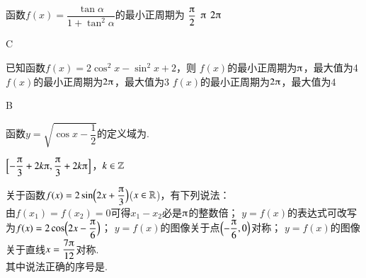     \begin{exercise}
      \item %
        函数$f(x)=\dfrac{\tan\alpha}{1+\tan^2\alpha}$的最小正周期为\xz
         {$\dfrac{\piup}2$}
         {$\piup$}
         {$2\piup$}
        \begin{answer}
          C
        \end{answer}
      \vspace{1.5em}
      \item %
        已知函数$f(x)=2\cos^2x-\sin^2x+2$，则\xz
         {$f(x)$的最小正周期为$\piup$，最大值为4}
         {$f(x)$的最小正周期为$2\piup$，最大值为3}
         {$f(x)$的最小正周期为$2\piup$，最大值为4}
        \begin{answer}
          B
        \end{answer}
      \vspace{1.5em}
      \item%
        函数$y=\sqrt{\cos x-\dfrac12}$的定义域为\tk.
        \begin{answer}
          $\Bigl[-\dfrac{\piup}3+2k\piup,\dfrac{\piup}3+2k\piup\Bigr]$，$k\in\mathbb{Z}$
        \end{answer}
      \vspace{1.5em}
      \item%
        关于函数$f(x)=2\sin\Bp{2x+\dfrac{\piup}3}$($x\in\mathbb{R}$)，有下列说法：\\
        由$f(x_1)=f(x_2)=0$可得$x_1-x_2$必是$\piup$的整数倍；
        $y=f(x)$的表达式可改写为$f(x)=2\cos\Bp{2x-\dfrac{\piup}6}$；
        $y=f(x)$的图像关于点$\Bp{-\dfrac{\piup}6,0}$对称；
        $y=f(x)$的图像关于直线$x=\dfrac{7\piup}{12}$对称.\\
        其中说法正确的序号是\tk.
        \begin{answer}

\end{answer}
\end{exercise}
